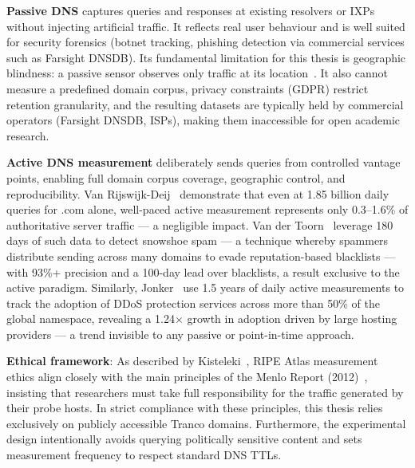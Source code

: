 \textbf{Passive \ac{DNS}} captures queries and responses at existing resolvers or \ac{IXPs} without injecting artificial traffic. It reflects real user behaviour and is well suited for security forensics (botnet tracking, phishing detection via commercial services such as Farsight DNSDB). Its fundamental limitation for this thesis is geographic blindness: a passive sensor observes only traffic at its location~\cite{vanRijswijk2016}. It also cannot measure a predefined domain corpus, privacy constraints (GDPR) restrict retention granularity, and the resulting datasets are typically held by commercial operators (Farsight DNSDB, \ac{ISP}s), making them inaccessible for open academic research.

\textbf{Active \ac{DNS} measurement} deliberately sends queries from controlled vantage points, enabling full domain corpus coverage, geographic control, and reproducibility. Van Rijswijk-Deij~\cite{vanRijswijk2016} demonstrate that even at 1.85 billion daily queries for .com alone, well-paced active measurement represents only 0.3–1.6\% of authoritative server traffic — a negligible impact. Van der Toorn~\cite{vanderToorn2018} leverage 180 days of such data to detect snowshoe spam — a technique whereby spammers distribute sending across many domains to evade reputation-based blacklists — with 93\%+ precision and a 100-day lead over blacklists, a result exclusive to the active paradigm. Similarly, Jonker~\cite{Jonker2016} use 1.5 years of daily active measurements to track the adoption of \ac{DDoS} protection services across more than 50\% of the global namespace, revealing a 1.24$\times$ growth in adoption driven by large hosting providers — a trend invisible to any passive or point-in-time approach.

\textbf{Ethical framework}: As described by Kisteleki~\cite{Kisteleki2016}, RIPE Atlas measurement ethics align closely with the main principles of the Menlo Report (2012)~\cite{Bailey2012}, insisting that researchers must take full responsibility for the traffic generated by their probe hosts. In strict compliance with these principles, this thesis relies exclusively on publicly accessible Tranco domains. Furthermore, the experimental design intentionally avoids querying politically sensitive content and sets measurement frequency to respect standard \ac{DNS} \ac{TTL}s.

